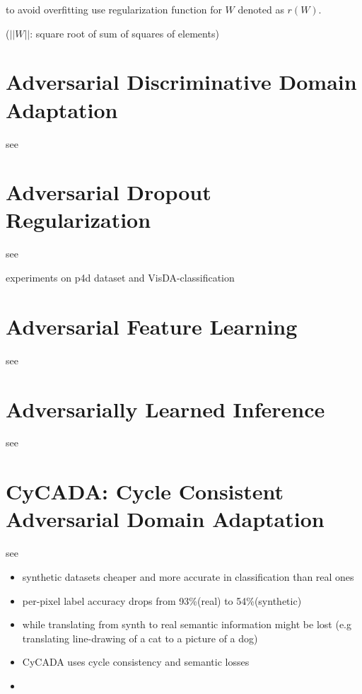 to avoid overfitting use regularization function for $W$ denoted as $r(W)$. 


($||W||$: square root of sum of squares of elements)


\section{Adversarial Discriminative Domain Adaptation}

see \cite{DBLP:journals/corr/TzengHSD17}


\section{Adversarial Dropout Regularization}

see \cite{DBLP:journals/corr/abs-1711-01575}

experiments on p4d dataset and VisDA-classification\\

\section{Adversarial Feature Learning}

see \cite{DBLP:journals/corr/DonahueKD16}


\section{Adversarially Learned Inference}

see \cite{dumoulin2016adversarially}

\section{CyCADA: Cycle Consistent Adversarial Domain Adaptation}

see \cite{DBLP:journals/corr/abs-1711-03213}
 
\begin{itemize}
	\item synthetic datasets cheaper and more accurate in classification than real ones
	\item per-pixel label accuracy drops from 93\%(real) to 54\%(synthetic)
	\item while translating from synth to real semantic information might be lost (e.g translating line-drawing of a cat to a picture of a dog)
	\item CyCADA uses cycle consistency and semantic losses
	\item 
\end{itemize}
